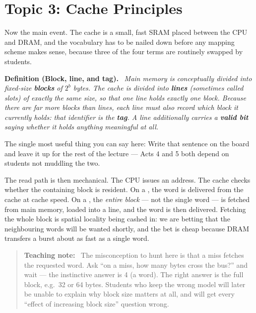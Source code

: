 \documentclass[11pt]{article}
\newenvironment{definitionbox}[1]{\par\noindent\textbf{Definition (#1).}\ \itshape}{\par\vspace{0.3em}}
\newenvironment{teachingaside}{\begin{quote}\small\color{primary-gold}\textbf{Teaching note:}\ }{\end{quote}}
\begin{document}
\section{Topic 3: Cache Principles}

Now the main event. The cache is a small, fast SRAM placed between the CPU and DRAM, and the vocabulary has to be nailed down before any mapping scheme makes sense, because three of the four terms are routinely swapped by students.

\begin{definitionbox}{Block, line, and tag}
Main memory is conceptually divided into fixed-size \textbf{blocks} of $2^b$ bytes. The cache is divided into \textbf{lines} (sometimes called slots) of exactly the same size, so that one line holds exactly one block. Because there are far more blocks than lines, each line must also record \emph{which} block it currently holds: that identifier is the \textbf{tag}. A line additionally carries a \textbf{valid bit} saying whether it holds anything meaningful at all.
\end{definitionbox}

The single most useful thing you can say here:  Write that sentence on the board and leave it up for the rest of the lecture --- Acts 4 and 5 both depend on students not muddling the two.

The read path is then mechanical. The CPU issues an address. The cache checks whether the containing block is resident. On a , the word is delivered from the cache at cache speed. On a , the \emph{entire block} --- not the single word --- is fetched from main memory, loaded into a line, and the word is then delivered. Fetching the whole block is spatial locality being cashed in: we are betting that the neighbouring words will be wanted shortly, and the bet is cheap because DRAM transfers a burst about as fast as a single word.

\begin{teachingaside}
The misconception to hunt here is that a miss fetches the requested word. Ask ``on a miss, how many bytes cross the bus?'' and wait --- the instinctive answer is 4 (a word). The right answer is the full block, e.g.\ 32 or 64 bytes. Students who keep the wrong model will later be unable to explain why block size matters at all, and will get every ``effect of increasing block size'' question wrong.
\end{teachingaside}
\end{document}
